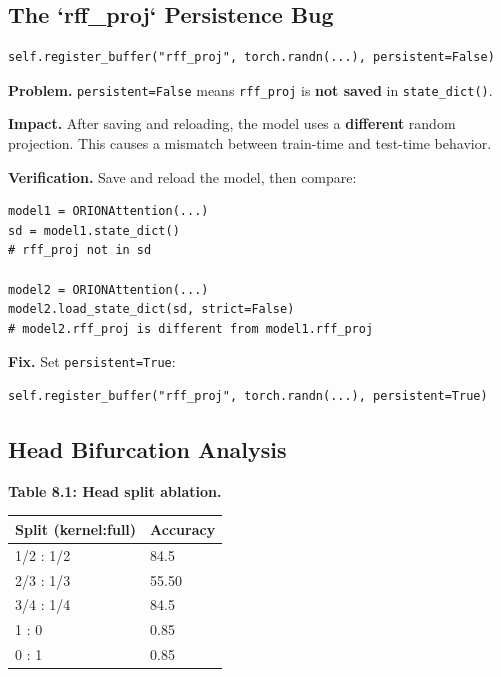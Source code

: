 \subsection{The `rff\_proj` Persistence Bug}

\begin{lstlisting}
self.register_buffer("rff_proj", torch.randn(...), persistent=False)
\end{lstlisting}

\textbf{Problem.} \texttt{persistent=False} means \texttt{rff\_proj} is \textbf{not saved} in 
\texttt{state\_dict()}.

\textbf{Impact.} After saving and reloading, the model uses a \textbf{different} 
random projection. This causes a mismatch between train-time and test-time 
behavior.

\textbf{Verification.} Save and reload the model, then compare:

\begin{lstlisting}
model1 = ORIONAttention(...)
sd = model1.state_dict()
# rff_proj not in sd

model2 = ORIONAttention(...)
model2.load_state_dict(sd, strict=False)
# model2.rff_proj is different from model1.rff_proj
\end{lstlisting}

\textbf{Fix.} Set \texttt{persistent=True}:

\begin{lstlisting}
self.register_buffer("rff_proj", torch.randn(...), persistent=True)
\end{lstlisting}

\subsection{Head Bifurcation Analysis}

\textbf{Table 8.1: Head split ablation.}

\begin{table}[H]
\centering
\small
\begin{tabular}{ll}
\toprule
\textbf{Split (kernel:full)} & \textbf{Accuracy} \\
\midrule
1/2 : 1/2 & 84.5 \\
2/3 : 1/3 & 55.50 \\
3/4 : 1/4 & 84.5 \\
1 : 0 & 0.85 \\
0 : 1 & 0.85 \\
\bottomrule
\end{tabular}
\end{table}

